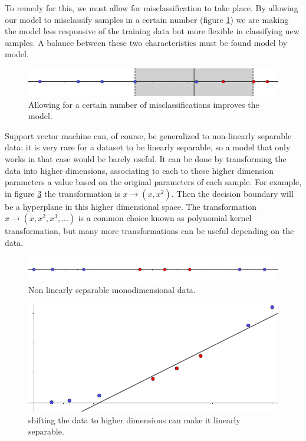 \documentclass[a4paper]{report}
\begin{document}
To remedy for this, we must allow for misclassification to take place.
By allowing our model to misclassify samples in a certain number (figure \ref{1dim_alw}) we are making the model less responsive of the training data but more flexible in classifying new samples.
A balance between these two characteristics must be found model by model.

\begin{figure} [H]
    \centering
    \includegraphics [width=\textwidth ]{svm/1dim_alw.png}
    \caption{Allowing for a certain number of  misclassifications improves the model.}
    \label{1dim_alw}
\end{figure}

Support vector machine can, of course, be generalized to non-linearly separable data:
it is very rare for a dataset to be linearly separable, so a model that only works in that case would be barely useful.
It can be done by transforming the data into higher dimensions, associating to each to these higher dimension parameters a value based on the original parameters of each sample.
For example, in figure \ref{2dim} the transformation is $x \xrightarrow{}(x,x^2)$.
Then the decision boundary will be a hyperplane in this higher dimensional space.
The transformation $x \xrightarrow{} (x, x^2, x^3, ...)$ is a common choice known as polynomial kernel transformation, but many more transformations can be useful depending on the data.

\begin{figure} [H]
    \centering
    \includegraphics [width=\textwidth ]{svm/1dim_ns.png}
    \caption{Non linearly separable monodimensional data.}
    \label{1dim_ns}
\end{figure}

\begin{figure} [H]
    \centering
    \includegraphics [width=\textwidth ]{svm/2dim.png}
    \caption{shifting the data to higher dimensions can make it linearly separable.}
    \label{2dim}
\end{figure}
\end{document}
